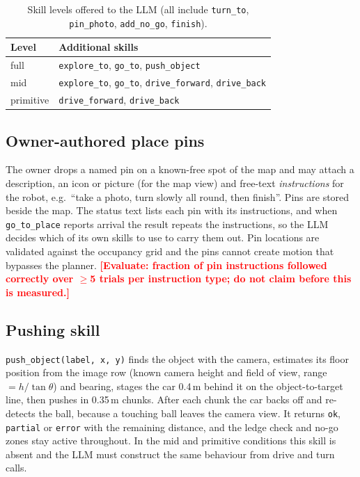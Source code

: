 \documentclass[conference]{IEEEtran}
\newcommand{\todo}[1]{\textcolor{red}{\textbf{[#1]}}}
\begin{document}
\begin{table}[t]
\caption{Skill levels offered to the LLM (all include \texttt{turn\_to}, \texttt{pin\_photo}, \texttt{add\_no\_go}, \texttt{finish}).}
\label{tab:levels}
\centering
\begin{tabular}{ll}
\toprule
Level & Additional skills \\
\midrule
full & \texttt{explore\_to}, \texttt{go\_to}, \texttt{push\_object} \\
mid & \texttt{explore\_to}, \texttt{go\_to}, \texttt{drive\_forward}, \texttt{drive\_back} \\
primitive & \texttt{drive\_forward}, \texttt{drive\_back} \\
\bottomrule
\end{tabular}
\end{table}

\subsection{Owner-authored place pins}
The owner drops a named pin on a known-free spot of the map and may attach a description, an icon or picture (for the map view) and free-text \emph{instructions} for the robot, e.g.\ ``take a photo, turn slowly all round, then finish''. Pins are stored beside the map. The status text lists each pin with its instructions, and when \texttt{go\_to\_place} reports arrival the result repeats the instructions, so the LLM decides which of its own skills to use to carry them out. Pin locations are validated against the occupancy grid and the pins cannot create motion that bypasses the planner. \todo{Evaluate: fraction of pin instructions followed correctly over $\ge$5 trials per instruction type; do not claim before this is measured.}

\subsection{Pushing skill}
\texttt{push\_object(label, x, y)} finds the object with the camera, estimates its floor position from the image row (known camera height and field of view, range $=h/\tan\theta$) and bearing, stages the car 0.4\,m behind it on the object-to-target line, then pushes in 0.35\,m chunks.
After each chunk the car backs off and re-detects the ball, because a touching ball leaves the camera view. It returns \texttt{ok}, \texttt{partial} or \texttt{error} with the remaining distance, and the ledge check and no-go zones stay active throughout.
In the mid and primitive conditions this skill is absent and the LLM must construct the same behaviour from drive and turn calls.
\end{document}
